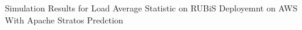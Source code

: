 Simulation Results for Load Average Statistic on RUBiS Deployemnt on AWS With Apache Stratos Predction